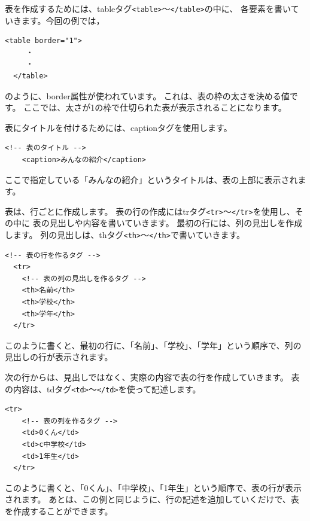 \clearpage

表を作成するためには、tableタグ\texttt{<table>}～\texttt{</table>}の中に、
各要素を書いていきます。今回の例では，
\bigskip

\begin{lstlisting}[caption=表の作成,label=pwdtest,firstnumber=1]
  <table border="1">
     ・
     ・
  </table>
\end{lstlisting} 

\noindent%
のように、border属性が使われています。
これは、表の枠の太さを決める値です。
ここでは、太さが1の枠で仕切られた表が表示されることになります。

表にタイトルを付けるためには、captionタグを使用します。
\bigskip
\begin{lstlisting}[caption=表のタイトル,label=pwdtest,firstnumber=1]
    <!-- 表のタイトル -->
    <caption>みんなの紹介</caption>
\end{lstlisting} 
\noindent%
ここで指定している「みんなの紹介」というタイトルは、表の上部に表示されます。

表は、行ごとに作成します。
表の行の作成にはtrタグ\texttt{<tr>}～\texttt{</tr>}を使用し、その中に
表の見出しや内容を書いていきます。
最初の行には、列の見出しを作成します。
列の見出しは、thタグ\texttt{<th>}～\texttt{</th>}で書いていきます。
\bigskip

\begin{lstlisting}[caption=表の行（列の見出し）,label=pwdtest,firstnumber=1]
  <!-- 表の行を作るタグ -->
  <tr>
    <!-- 表の列の見出しを作るタグ -->
    <th>名前</th>
    <th>学校</th>
    <th>学年</th>
  </tr>
\end{lstlisting} 

\noindent%
このように書くと、最初の行に、「名前」、「学校」、「学年」という順序で、列の見出しの行が表示されます。

次の行からは、見出しではなく、実際の内容で表の行を作成していきます。
表の内容は、tdタグ\texttt{<td>}～\texttt{</td>}を使って記述します。
\bigskip

\begin{lstlisting}[caption=表の行,label=pwdtest,firstnumber=1]
  <tr>
    <!-- 表の列を作るタグ -->
    <td>0くん</td>
    <td>c中学校</td>
    <td>1年生</td>
  </tr>
\end{lstlisting} 

\noindent%
このように書くと、「0くん」、「中学校」、「1年生」という順序で、表の行が表示されます。
あとは、この例と同じように、行の記述を追加していくだけで、表を作成することができます。

\begin{tcolorbox}[title=\useOmetoi,breakable]
  \begin{enumerate}
  \end{enumerate}
\end{tcolorbox}
\clearpage


